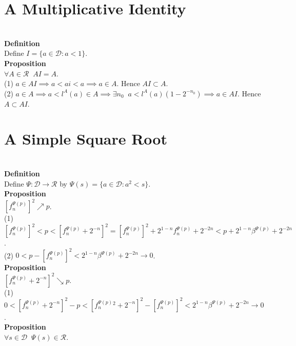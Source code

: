 \documentclass{article}
\newcommand{\targetset}{ \mathscr{R}}
\newcommand{\sourceset}{ \mathscr{D}}
\newcommand{\leaper}{l}
\newcommand{\elt}{a}
\newcommand{\altelt}{s}
\newcommand{\rooter}{\Psi}
\newcommand{\umbrella}{\beta}
\begin{document}
\section{A Multiplicative Identity}\\



\textbf{Definition}\\
Define $I = \{\elt \in \sourceset : \elt < 1 \}$.\\

\textbf{Proposition}\\
$\forall A \in \targetset \;\; AI = A$.\\

(1) $\elt \in AI \implies \elt < ai < a \implies \elt \in A$. Hence $AI \subset A$.\\
(2) $\elt \in A \implies \elt < \leaper^A(\elt) \in A \implies \exists n_0 \;\; \elt < \leaper^A(\elt)(1-2^{-n_0}) \implies a \in AI.$ Hence $A \subset AI$. \\

\section{A Simple Square Root}\\

\textbf{Definition}\\
Define $\rooter : \sourceset \to \targetset$ by $\rooter(\altelt) = \{\elt \in \sourceset: \elt^2 < \altelt\}.$\\ 

\textbf{Proposition}\\
$[f^{\rooter(p)}_n]^2 \nearrow p$.\\

(1) $[f^{\rooter(p)}_n]^2 < p < [ f^{\rooter(p)}_n + 2^{-n} ]^2 = [f^{\rooter(p)}_n]^2  + 2^{1-n} f^{\rooter(p)}_n +  2^{-2n} < p + 2^{1-n} \umbrella^{\rooter(p)} + 2^{-2n}$.\\
(2) $0 < p - [f^{\rooter(p)}_n]^2 < 2^{1-n} \umbrella^{\rooter(p)} + 2^{-2n} \to 0$.\\

\textbf{Proposition}\\
$[f^{\rooter(p)}_n +2^{-n}]^2 \searrow p$.\\

(1) $0 < [ f^{\rooter(p)}_n + 2^{-n} ]^2 - p < [ f^{\rooter(p)}_n^2 + 2^{-n} ]^2 -[f^{\rooter(p)}_n]^2 < 2^{1-n} \umbrella^{\rooter(p)} + 2^{-2n} \to 0$.\\

\textbf{Proposition}\\
$\forall \altelt \in \sourceset \;\; \rooter(\altelt) \in \targetset$.\\
\end{document}
